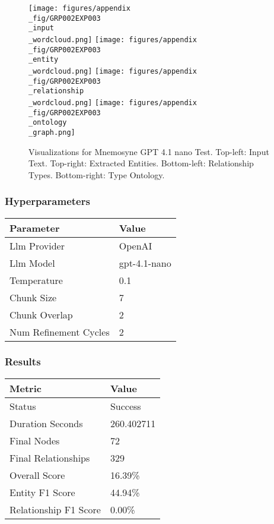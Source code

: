 \begin{figure}[!ht]
  \centering
  \texttt{[image: figures/appendix\\\_fig/GRP002EXP003\\\_input\\\_wordcloud.png]}
  \texttt{[image: figures/appendix\\\_fig/GRP002EXP003\\\_entity\\\_wordcloud.png]}
  \texttt{[image: figures/appendix\\\_fig/GRP002EXP003\\\_relationship\\\_wordcloud.png]}
  \texttt{[image: figures/appendix\\\_fig/GRP002EXP003\\\_ontology\\\_graph.png]}
  \caption{Visualizations for Mnemosyne GPT 4.1 nano Test. Top-left: Input Text. Top-right: Extracted Entities. Bottom-left: Relationship Types. Bottom-right: Type Ontology.}
\end{figure}
\clearpage
\subsubsection{Hyperparameters}
\begin{tabular}{ll}
\toprule
\textbf{Parameter} & \textbf{Value} \\
\midrule
Llm Provider & OpenAI \\
Llm Model & gpt-4.1-nano \\
Temperature & 0.1 \\
Chunk Size & 7 \\
Chunk Overlap & 2 \\
Num Refinement Cycles & 2 \\
\bottomrule
\end{tabular}

\subsubsection{Results}
\begin{tabular}{ll}
\toprule
\textbf{Metric} & \textbf{Value} \\
\midrule
Status & Success \\
Duration Seconds & 260.402711 \\
Final Nodes & 72 \\
Final Relationships & 329 \\
Overall Score & 16.39\% \\
Entity F1 Score & 44.94\% \\
Relationship F1 Score & 0.00\% \\
\bottomrule
\end{tabular}
